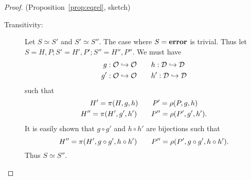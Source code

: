\begin{proof}{(Proposition~\ref{prop:eqrel}, sketch)}
\begin{description}
    \item[Transitivity:] Let $S \simeq S'$ and $S' \simeq S''$. The case where
      $S = \mbox{{\bf error}}$ is trivial. Thus let $S = H,P; S' = H',P'; S'' = H'', P''$.
      We must have
      \begin{equation*}
        \begin{gathered}
          g: \mathcal{O} \hookrightarrow \mathcal{O} \quad\quad h: \mathcal{D}
          \hookrightarrow \mathcal{D} \\
          g': \mathcal{O} \hookrightarrow \mathcal{O} \quad\quad h': \mathcal{D}
          \hookrightarrow \mathcal{D}
        \end{gathered}
      \end{equation*}
      such that
      \begin{equation*}
        \begin{gathered}
          H' = \pi(H, g, h) \quad\quad P' = \rho(P, g, h)  \\
          H'' = \pi(H', g', h') \quad\quad P'' = \rho(P', g', h').
        \end{gathered}
      \end{equation*}
      It is easily shown that $g \circ g'$ and $h \circ h'$ are bijections such
      that 
      \begin{equation*}
        H'' = \pi(H', g \circ g', h \circ h') \quad\quad P'' = \rho(P', g \circ
        g', h \circ h').
      \end{equation*}
      Thus $S \simeq S''$.
  \end{description}
\end{proof}

